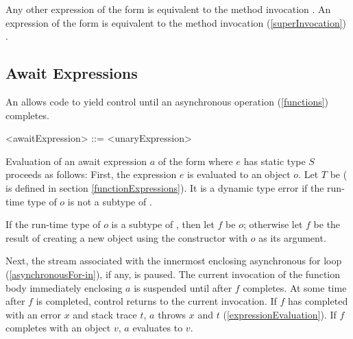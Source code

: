 \documentclass[makeidx]{article}
\begin{document}
{\LMHash{}%
Any other expression of the form  is equivalent to
the method invocation .
An expression of the form  is equivalent to
the method invocation (\ref{superInvocation}) .


\subsection{Await Expressions}

\LMHash{}%
An  allows code to yield control until an asynchronous operation (\ref{functions}) completes.

\begin{grammar}
<awaitExpression> ::= \AWAIT{} <unaryExpression>
\end{grammar}

\LMHash{}%
Evaluation of an await expression $a$ of the form 
where $e$ has static type $S$ proceeds as follows:
First, the expression $e$ is evaluated to an object $o$.
Let $T$ be 
(\flatten{} is defined in section \ref{functionExpressions}).
It is a dynamic type error if the run-time type of $o$ is not a subtype
of  .

\LMHash{}%
If the run-time type of $o$ is a subtype of , then let $f$ be $o$; otherwise let $f$ be the result of creating a new object using the constructor  with $o$ as its argument.

\LMHash{}%
Next, the stream associated with the innermost enclosing asynchronous for loop (\ref{asynchronousFor-in}), if any, is paused.
The current invocation of the function body immediately enclosing $a$ is suspended until after $f$ completes.
At some time after $f$ is completed, control returns to the current invocation.
If $f$ has completed with an error $x$ and stack trace $t$,
$a$ throws $x$ and $t$
(\ref{expressionEvaluation}).
If $f$ completes with an object $v$, $a$ evaluates to $v$.



}
\end{document}
